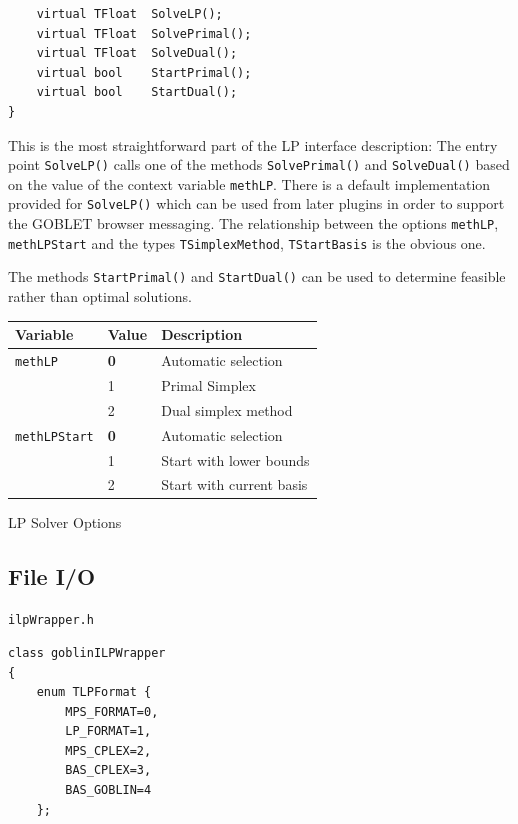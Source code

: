 \documentclass[a4paper,11pt,twoside]{book}
\begin{document}
\begin{multicols}{2}
\begin{mymethods}
\begin{verbatim}
    virtual TFloat  SolveLP();
    virtual TFloat  SolvePrimal();
    virtual TFloat  SolveDual();
    virtual bool    StartPrimal();
    virtual bool    StartDual();
}
\end{verbatim}
\end{mymethods}
This is the most straightforward part of the LP interface description:
The entry point \verb/SolveLP()/ calls one of the methods \verb/SolvePrimal()/
and \verb/SolveDual()/ based on the value of the context variable \verb/methLP/.
There is a default implementation provided for \verb/SolveLP()/ which can be
used from later plugins in order to support the GOBLET browser messaging.
The relationship between the options \verb/methLP/, \verb/methLPStart/ and the
types \verb/TSimplexMethod/, \verb/TStartBasis/ is the obvious one.

The methods \verb/StartPrimal()/ and \verb/StartDual()/ can be used to
determine feasible rather than optimal solutions.


\begin{tablehere}
\begin{center}
\vspace*{1cm}
\begin{tabular}{|p{3cm}|p{1cm}|p{5cm}|}
\hline
{\bf Variable} & {\bf Value} & {\bf Description} \\
\hline
\hline
\verb/methLP/       & {\bf 0} & Automatic selection \\
                    & 1 & Primal Simplex \\
                    & 2 & Dual simplex method \\
\hline
\verb/methLPStart/  & {\bf 0} & Automatic selection \\
                    & 1 & Start with lower bounds \\
                    & 2 & Start with current basis \\
\hline
\end{tabular}
\end{center}
\caption{\label{tlb_lp_opt}LP Solver Options}
\end{tablehere}


\newpage
\subsection{File I/O}
\myinclude\verb/ilpWrapper.h/
\begin{mymethods}
\begin{verbatim}
class goblinILPWrapper
{
    enum TLPFormat {
        MPS_FORMAT=0,
        LP_FORMAT=1,
        MPS_CPLEX=2,
        BAS_CPLEX=3,
        BAS_GOBLIN=4
    };


\end{verbatim}
\end{mymethods}
\end{multicols}
\end{document}

